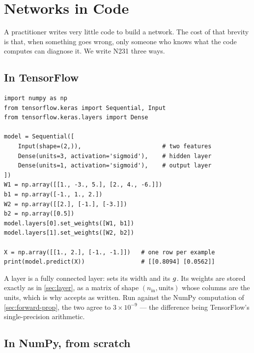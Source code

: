 \section{Networks in Code}
\label{sec:nn-code}

A practitioner writes very little code to build a network. The cost of that
brevity is that, when something goes wrong, only someone who knows what the
code computes can diagnose it. We write N231 three ways.

\subsection{In TensorFlow}

\begin{lstlisting}[style=tfkeras, caption={N231 in Keras, with the hand-chosen weights loaded.}, label={lst:n231-keras}]
import numpy as np
from tensorflow.keras import Sequential, Input
from tensorflow.keras.layers import Dense

model = Sequential([
    Input(shape=(2,)),                       # two features
    Dense(units=3, activation='sigmoid'),    # hidden layer
    Dense(units=1, activation='sigmoid'),    # output layer
])
W1 = np.array([[1., -3., 5.], [2., 4., -6.]])
b1 = np.array([-1., 1., 2.])
W2 = np.array([[2.], [-1.], [-3.]])
b2 = np.array([0.5])
model.layers[0].set_weights([W1, b1])
model.layers[1].set_weights([W2, b2])

X = np.array([[1., 2.], [-1., -1.]])   # one row per example
print(model.predict(X))                # [[0.8094] [0.0562]]
\end{lstlisting}

A  layer is a fully connected layer:  sets its width and
 its $g$. Its weights are stored exactly as in
\cref{sec:layer}, as a matrix of shape $(n_{\text{in}}, \text{units})$ whose
columns are the units, which is why  accepts  as
written. Run against the NumPy computation of \cref{sec:forward-prop}, the two
agree to $3\times10^{-9}$ --- the difference being TensorFlow's single-precision
arithmetic.

\subsection{In NumPy, from scratch}

